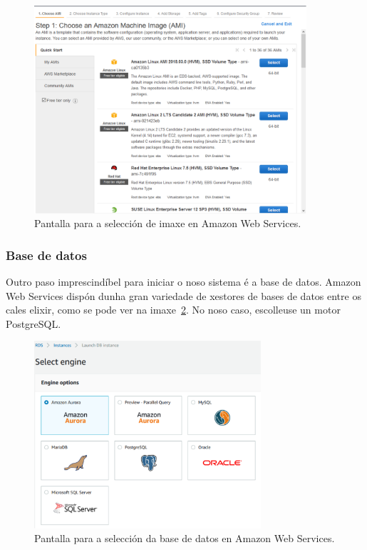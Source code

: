 \begin{figure}[h]
	\begin{center}
		\includegraphics[width=0.9\textwidth]{figures/capturas/AWSImaxes}
		\caption{Pantalla para a selección de imaxe en Amazon Web Services.}
		\label{fig:AWSImaxes}
	\end{center}
\end{figure}

\subsubsection{Base de datos}
Outro paso imprescindíbel para iniciar o noso sistema é a base de datos. Amazon Web Services dispón dunha gran variedade de xestores de bases de datos entre os cales elixir, como se pode ver na imaxe~\ref{fig:AWSBD}. No noso caso, escolleuse un motor PostgreSQL.

\begin{figure}[h]
	\begin{center}
		\includegraphics[width=0.75\textwidth]{figures/capturas/AWSBD}
		\caption{Pantalla para a selección da base de datos en Amazon Web Services.}
		\label{fig:AWSBD}
	\end{center}
\end{figure}

